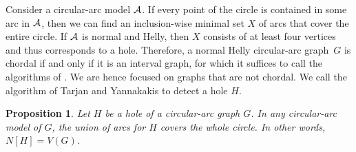 \documentclass[10pt]{article}
\newtheorem{proposition}[theorem]{Proposition}
\newcommand{\nhcag}{normal Helly circular-arc graph}
\begin{document}
Consider a circular-arc model $\cal A$.  If every point of the circle
is contained in some arc in $\cal A$, then we can find an
inclusion-wise minimal set $X$ of arcs that cover the entire circle.
If $\cal A$ is normal and Helly, then $X$ consists of at least four
vertices and thus corresponds to a hole.  Therefore, a \nhcag\ $G$ is
chordal if and only if it is an interval graph, for which it suffices
to call the algorithms of
\cite{kratsch-06-certifying-interval-and-permutation,lindzey-13-find-forbidden-subgraphs}.
We are hence focused on graphs that are not chordal.  We call the
algorithm of Tarjan and Yannakakis
\cite{tarjan-84-chordal-recognition} to detect a hole $H$.
\begin{proposition}\label{lem:fundamental}
  Let $H$ be a hole of a circular-arc graph $G$.  In any circular-arc
  model of $G$, the union of arcs for $H$ covers the whole circle.
  In other words, $N[H] = V(G)$.
\end{proposition}
\end{document}
